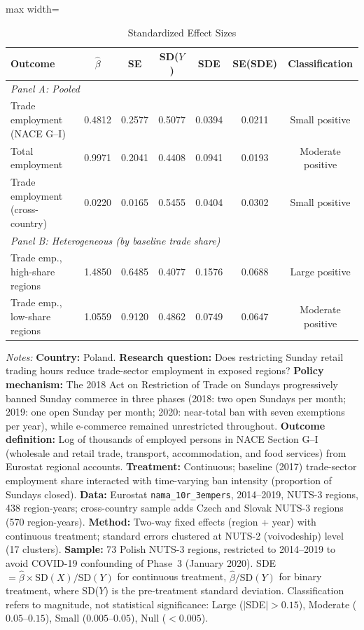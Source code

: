 \begin{table}[htbp]
\centering
\caption{Standardized Effect Sizes}
\label{tab:sde}
\begin{adjustbox}{max width=\textwidth}
\begin{tabular}{lcccccc}
\hline\hline
Outcome & $\hat{\beta}$ & SE & SD($Y$) & SDE & SE(SDE) & Classification \\
\hline
\multicolumn{7}{l}{\textit{Panel A: Pooled}} \\
Trade employment (NACE G--I) & 0.4812 & 0.2577 & 0.5077 & 0.0394 & 0.0211 & Small positive \\
Total employment & 0.9971 & 0.2041 & 0.4408 & 0.0941 & 0.0193 & Moderate positive \\
Trade employment (cross-country) & 0.0220 & 0.0165 & 0.5455 & 0.0404 & 0.0302 & Small positive \\
\hline
\multicolumn{7}{l}{\textit{Panel B: Heterogeneous (by baseline trade share)}} \\
Trade emp., high-share regions & 1.4850 & 0.6485 & 0.4077 & 0.1576 & 0.0688 & Large positive \\
Trade emp., low-share regions & 1.0559 & 0.9120 & 0.4862 & 0.0749 & 0.0647 & Moderate positive \\
\hline\hline
\end{tabular}
\end{adjustbox}
\begin{tablenotes}[flushleft]
\small
\item \textit{Notes:} \textbf{Country:} Poland. \textbf{Research question:} Does restricting Sunday retail trading hours reduce trade-sector employment in exposed regions? \textbf{Policy mechanism:} The 2018 Act on Restriction of Trade on Sundays progressively banned Sunday commerce in three phases (2018: two open Sundays per month; 2019: one open Sunday per month; 2020: near-total ban with seven exemptions per year), while e-commerce remained unrestricted throughout. \textbf{Outcome definition:} Log of thousands of employed persons in NACE Section G--I (wholesale and retail trade, transport, accommodation, and food services) from Eurostat regional accounts. \textbf{Treatment:} Continuous; baseline (2017) trade-sector employment share interacted with time-varying ban intensity (proportion of Sundays closed). \textbf{Data:} Eurostat \texttt{nama\_10r\_3empers}, 2014--2019, NUTS-3 regions, 438 region-years; cross-country sample adds Czech and Slovak NUTS-3 regions (570 region-years). \textbf{Method:} Two-way fixed effects (region + year) with continuous treatment; standard errors clustered at NUTS-2 (voivodeship) level (17 clusters). \textbf{Sample:} 73 Polish NUTS-3 regions, restricted to 2014--2019 to avoid COVID-19 confounding of Phase~3 (January 2020). SDE $= \hat{\beta} \times \text{SD}(X) / \text{SD}(Y)$ for continuous treatment, $\hat{\beta} / \text{SD}(Y)$ for binary treatment, where SD($Y$) is the pre-treatment standard deviation. Classification refers to magnitude, not statistical significance: Large ($|$SDE$| > 0.15$), Moderate ($0.05$--$0.15$), Small ($0.005$--$0.05$), Null ($< 0.005$).
\end{tablenotes}
\end{table}

